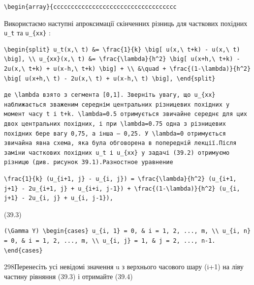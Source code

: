 \documentclass[
  ukrainian,
]{article}
\begin{document}
\begin{verbatim}
\begin{array}{ccccccccccccccccccccccccccccccccccc
\end{verbatim}

Використаємо наступні апроксимації скінченних різниць для часткових
похідних \texttt{u\_t} та \texttt{u\_\{xx\}} :

\begin{verbatim}
\begin{split} u_t(x,\ t) &= \frac{1}{k} \big[ u(x,\ t+k) - u(x,\ t) \big], \\ u_{xx}(x,\ t) &= \frac{\lambda}{h^2} \big[ u(x+h,\ t+k) - 2u(x,\ t+k) + u(x-h,\ t+k) \big] + \\ &\quad + \frac{(1-\lambda)}{h^2} \big[ u(x+h,\ t) - 2u(x,\ t) + u(x-h,\ t) \big], \end{split}
\end{verbatim}

\begin{verbatim}
де \lambda взято з сегмента [0,1]. Зверніть увагу, що u_{xx} наближається зваженим середнім центральних різницевих похідних у момент часу t і t+k. \lambda=0.5 отримується звичайне середнє для цих двох центральних похідних, і при \lambda=0.75 одна з різницевих похідних бере вагу 0,75, а інша — 0,25. У \lambda=0 отримується звичайна явна схема, яка була обговорена в попередній лекції.Після заміни часткових похідних u_t і u_{xx} у задачі (39.2) отримуємо різницю (див. рисунок 39.1).Разностное уравнение
\end{verbatim}

\begin{verbatim}
\frac{1}{k} (u_{i+1, j} - u_{i, j}) = \frac{\lambda}{h^2} (u_{i+1, j+1} - 2u_{i+1, j} + u_{i+i, j-1}) + \frac{(1-\lambda)}{h^2} (u_{i, j+1} - 2u_{i, j} + u_{i, j-1}),
\end{verbatim}

(39.3)

\begin{verbatim}
(\Gamma Y) \begin{cases} u_{i, 1} = 0, & i = 1, 2, ..., m, \\ u_{i, n} = 0, & i = 1, 2, ..., m, \\ u_{i, j} = 1, & j = 2, ..., n-1. \end{cases}
\end{verbatim}

298Перенесіть усі невідомі значення u з верхнього часового шару (i+1) на
ліву частину рівняння (39.3) і отримайте (39.4)
\end{document}
